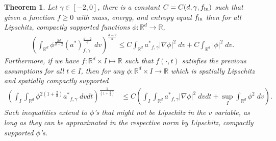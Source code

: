 \documentclass[12pt,american]{amsart}
\numberwithin{equation}{section}
\theoremstyle{plain}
\newtheorem{thm}{Theorem}[section]
\theoremstyle{definition}                  %
\def\astar{{a^*}}
\def\fin{f_{\textnormal{in}}}
\begin{document}
\begin{thm}\label{lem:Inequalities Sobolev weight aII}
  Let $\gamma \in [-2,0]$, there is a constant $C=C(d,\gamma,\fin)$ such that given a function $f\geq 0$ with mass, energy, and entropy equal $\fin$ then for all Lipschitz, compactly supported functions $\phi:\mathbb{R}^d\to\mathbb{R}$,
  \begin{align*}
    \left ( \int_{\mathbb{R}^d}  \phi^{\frac{2d}{d-2}}(\astar)_{f,\gamma}^{\frac{d-2}{d}} \;dv\right )^{\frac{d-2}{d}}\leq C\int_{\mathbb{R}^d} \astar_{f,\gamma} |\nabla \phi|^2\;dv+C\int_{\mathbb{R}^d}|\phi|^2\;dv.		
  \end{align*}			
  Furthermore, if we have $f:\mathbb{R}^d\times I \mapsto \mathbb{R}$ such that $f(\cdot,t)$ satisfies the previous assumptions for all $t\in I$, then for any $\phi:\mathbb{R}^d\times  I\to\mathbb{R}$ which is spatially Lipschitz and spatially compactly supported 
  \begin{align*}
    \left ( \int_{I}\int_{\mathbb{R}^d} \phi^{2(1+\frac{2}{d})} \astar_{f,\gamma} \;dvdt \right )^{\frac{1}{(1+\frac{2}{d})}} & \leq C\left ( \int_{I} \int_{\mathbb{R}^d} \astar_{f,\gamma} |\nabla \phi|^2 \;dvdt +  \sup \limits_{I} \int_{\mathbb{R}^d} \phi^{2}\;dv \right ).
  \end{align*}
  Such inequalities extend to $\phi$'s that might not be Lipschitz in the $v$ variable, as long as they can be approximated in the respective norm by Lipschitz, compactly supported $\phi$'s.
\end{thm}
\end{document}
